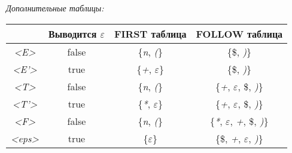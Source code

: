 \documentclass[10pt,twoside,a4paper]{memoir}
\begin{document}
\begin{center}
\textsl{Дополнительные таблицы:}

\begin{tabular}{ |c||c|c|c| }
\hline
 & Выводится $\varepsilon$ & FIRST таблица & FOLLOW таблица \\
\hline\hline
\textsl{\textless E\textgreater} & false & \{\textit{n}, \textit{(}\} & \{\$, \textit{)}\}\\ \hline
\textsl{\textless E'\textgreater} & true & \{\textit{+}, $\varepsilon$\} & \{\$, \textit{)}\}\\ \hline
\textsl{\textless T\textgreater} & false & \{\textit{n}, \textit{(}\} & \{\textit{+}, $\varepsilon$, \$, \textit{)}\}\\ \hline
\textsl{\textless T'\textgreater} & true & \{\textit{*}, $\varepsilon$\} & \{\textit{+}, $\varepsilon$, \$, \textit{)}\}\\ \hline
\textsl{\textless F\textgreater} & false & \{\textit{n}, \textit{(}\} & \{\textit{*}, $\varepsilon$, \textit{+}, \$, \textit{)}\}\\ \hline
\textsl{\textless eps\textgreater} & true & \{$\varepsilon$\} & \{\$, \textit{+}, $\varepsilon$, \textit{)}\}\\
\hline
\end{tabular}

\end{center}     
\end{document}
